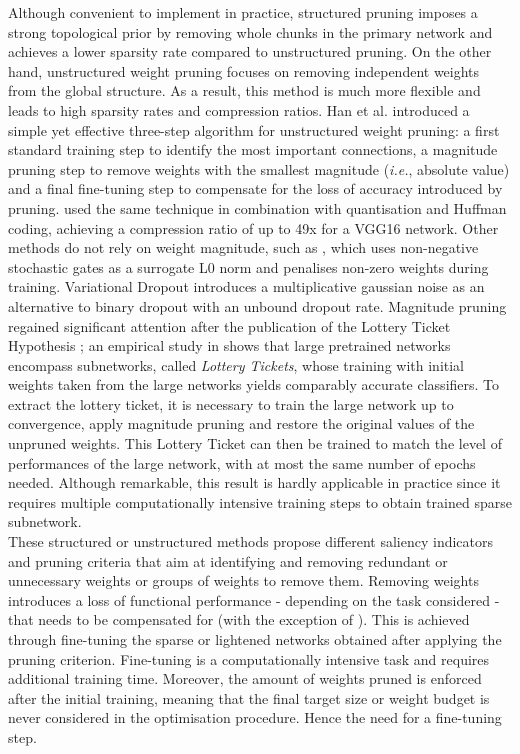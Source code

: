 Although convenient to implement in practice, structured pruning imposes a
strong topological prior by removing whole chunks in the primary network and
achieves a lower sparsity rate compared to unstructured pruning. On the other
hand, unstructured weight pruning focuses on removing independent weights from
the global structure. As a result, this method is much more flexible and leads
to high sparsity rates and compression ratios. Han et al.
\cite{DBLP:conf/nips/HanPTD15} introduced a simple yet effective three-step
algorithm for unstructured weight pruning: a first standard training step to
identify the most important connections, a magnitude pruning step to remove
weights with the smallest magnitude (\emph{i.e.}, absolute value) and a final
fine-tuning step to compensate for the loss of accuracy introduced by pruning.
\cite{DBLP:journals/corr/HanMD15} used the same technique in combination with
quantisation and Huffman coding, achieving a compression ratio of up to 49x for
a VGG16 network. Other methods do not rely on weight magnitude, such as
\cite{DBLP:conf/iclr/LouizosWK18}, which uses non-negative stochastic gates as a
surrogate L0 norm and penalises non-zero weights during training. Variational
Dropout \cite{DBLP:conf/icml/MolchanovAV17} introduces a multiplicative gaussian
noise as an alternative to binary dropout
\cite{DBLP:journals/corr/abs-1207-0580,DBLP:journals/jmlr/SrivastavaHKSS14} with
an unbound dropout rate. Magnitude pruning regained significant attention after
the publication of the Lottery Ticket Hypothesis
\cite{DBLP:conf/iclr/FrankleC19}; an empirical study in
\cite{DBLP:conf/iclr/FrankleC19} shows that large pretrained networks encompass
subnetworks, called \textit{Lottery Tickets}, whose training with initial
weights taken from the large networks yields comparably accurate classifiers. To
extract the lottery ticket, it is necessary to train the large network up to
convergence, apply magnitude pruning and restore the original values of the
unpruned weights. This Lottery Ticket can then be trained to match the level of
performances of the large network, with at most the same number of epochs
needed. Although remarkable, this result is hardly applicable in practice since
it requires multiple computationally intensive training steps to obtain trained
sparse subnetwork.\\


These structured or unstructured methods propose different saliency indicators
and pruning criteria that aim at identifying and removing redundant or
unnecessary weights or groups of weights to remove them. Removing
weights introduces a loss of functional performance - depending on the task
considered - that needs to be compensated for (with the exception of
\cite{DBLP:conf/icml/KangH20}). This is achieved through fine-tuning the sparse
or lightened networks obtained after applying the pruning criterion. Fine-tuning
is a computationally intensive task and requires additional training time.
Moreover, the amount of weights pruned is enforced after the initial training,
meaning that the final target size or weight budget is never considered in the
optimisation procedure. Hence the need for a fine-tuning step. \\


